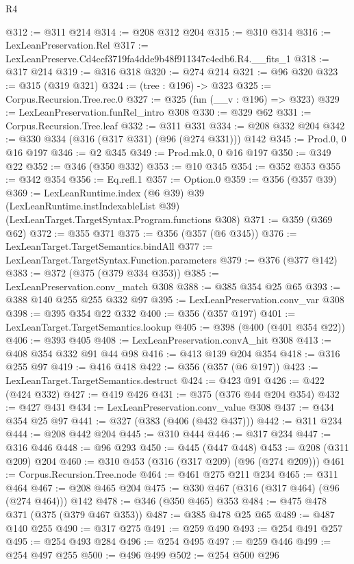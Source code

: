 \begin{lexlean}{R4}
\begin{coremodule}
@312 := @311 @214
@314 := @208 @312 @204
@315 := @310 @314
@316 := LexLeanPreservation.Rel
@317 := LexLeanPreserve.Cd4ccf3719fa4dde9b48f911347c4edb6.R4.__fits_1
@318 := @317 @214
@319 := @316 @318
@320 := @274 @214
@321 := @96 @320
@323 := @315 (@319 @321)
@324 := (tree : @196) -> @323
@325 := Corpus.Recursion.Tree.rec.{0}
@327 := @325 (fun (__v : @196) => @323)
@329 := LexLeanPreservation.funRel_intro @308
@330 := @329 @62
@331 := Corpus.Recursion.Tree.leaf
@332 := @311 @331
@334 := @208 @332 @204
@342 := @330 @334 (@316 (@317 @331) (@96 (@274 @331))) @142
@345 := Prod.{0, 0} @16 @197
@346 := @2 @345
@349 := Prod.mk.{0, 0} @16 @197
@350 := @349 @22
@352 := @346 (@350 @332)
@353 := @10 @345
@354 := @352 @353
@355 := @342 @354
@356 := Eq.refl.{1}
@357 := Option.{0}
@359 := @356 (@357 @39)
@369 := LexLeanRuntime.index
    (@6 @39)
    @39
    (LexLeanRuntime.instIndexableList @39)
    (LexLeanTarget.TargetSyntax.Program.functions @308)
@371 := @359 (@369 @62)
@372 := @355 @371
@375 := @356 (@357 (@6 @345))
@376 := LexLeanTarget.TargetSemantics.bindAll
@377 := LexLeanTarget.TargetSyntax.Function.parameters
@379 := @376 (@377 @142)
@383 := @372 (@375 (@379 @334 @353))
@385 := LexLeanPreservation.conv_match @308
@388 := @385 @354 @25 @65
@393 := @388 @140 @255 @255 @332 @97
@395 := LexLeanPreservation.conv_var @308
@398 := @395 @354 @22 @332
@400 := @356 (@357 @197)
@401 := LexLeanTarget.TargetSemantics.lookup
@405 := @398 (@400 (@401 @354 @22))
@406 := @393 @405
@408 := LexLeanPreservation.convA_hit @308
@413 := @408 @354 @332 @91 @44 @98
@416 := @413 @139 @204 @354
@418 := @316 @255 @97
@419 := @416 @418
@422 := @356 (@357 (@6 @197))
@423 := LexLeanTarget.TargetSemantics.destruct
@424 := @423 @91
@426 := @422 (@424 @332)
@427 := @419 @426
@431 := @375 (@376 @44 @204 @354)
@432 := @427 @431
@434 := LexLeanPreservation.conv_value @308
@437 := @434 @354 @25 @97
@441 := @327 (@383 (@406 (@432 @437)))
@442 := @311 @234
@444 := @208 @442 @204
@445 := @310 @444
@446 := @317 @234
@447 := @316 @446
@448 := @96 @293
@450 := @445 (@447 @448)
@453 := @208 (@311 @209) @204
@460 := @310 @453 (@316 (@317 @209) (@96 (@274 @209)))
@461 := Corpus.Recursion.Tree.node
@464 := @461 @275 @211 @234
@465 := @311 @464
@467 := @208 @465 @204
@475 := @330 @467 (@316 (@317 @464) (@96 (@274 @464))) @142
@478 := @346 (@350 @465) @353
@484 := @475 @478 @371 (@375 (@379 @467 @353))
@487 := @385 @478 @25 @65
@489 := @487 @140 @255
@490 := @317 @275
@491 := @259 @490
@493 := @254 @491 @257
@495 := @254 @493 @284
@496 := @254 @495
@497 := @259 @446
@499 := @254 @497 @255
@500 := @496 @499
@502 := @254 @500 @296

\end{coremodule}
\end{lexlean}
